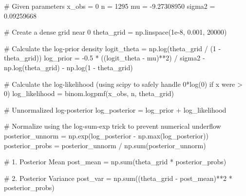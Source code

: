 \documentclass[
  letterpaper,
  DIV=11,
  numbers=noendperiod]{scrartcl}
\newenvironment{Shaded}{\begin{snugshade}}{\end{snugshade}}
\newcommand{\BuiltInTok}[1]{\textcolor[rgb]{0.00,0.23,0.31}{#1}}
\newcommand{\CommentTok}[1]{\textcolor[rgb]{0.37,0.37,0.37}{#1}}
\newcommand{\DecValTok}[1]{\textcolor[rgb]{0.68,0.00,0.00}{#1}}
\newcommand{\FloatTok}[1]{\textcolor[rgb]{0.68,0.00,0.00}{#1}}
\newcommand{\NormalTok}[1]{\textcolor[rgb]{0.00,0.23,0.31}{#1}}
\newcommand{\OperatorTok}[1]{\textcolor[rgb]{0.37,0.37,0.37}{#1}}
\begin{document}
\begin{Shaded}
\begin{Highlighting}[]
\CommentTok{\# Given parameters}
\NormalTok{x\_obs }\OperatorTok{=} \DecValTok{0}
\NormalTok{n }\OperatorTok{=} \DecValTok{1295}
\NormalTok{mu }\OperatorTok{=} \OperatorTok{{-}}\FloatTok{9.27308950}
\NormalTok{sigma2 }\OperatorTok{=} \FloatTok{0.09259668}

\CommentTok{\# Create a dense grid near 0}
\NormalTok{theta\_grid }\OperatorTok{=}\NormalTok{ np.linspace(}\FloatTok{1e{-}8}\NormalTok{, }\FloatTok{0.001}\NormalTok{, }\DecValTok{20000}\NormalTok{)}

\CommentTok{\# Calculate the log{-}prior density}
\NormalTok{logit\_theta }\OperatorTok{=}\NormalTok{ np.log(theta\_grid }\OperatorTok{/}\NormalTok{ (}\DecValTok{1} \OperatorTok{{-}}\NormalTok{ theta\_grid))}
\NormalTok{log\_prior }\OperatorTok{=} \OperatorTok{{-}}\FloatTok{0.5} \OperatorTok{*}\NormalTok{ ((logit\_theta }\OperatorTok{{-}}\NormalTok{ mu)}\OperatorTok{**}\DecValTok{2}\NormalTok{) }\OperatorTok{/}\NormalTok{ sigma2 }\OperatorTok{{-}}\NormalTok{ np.log(theta\_grid) }\OperatorTok{{-}}\NormalTok{ np.log(}\DecValTok{1} \OperatorTok{{-}}\NormalTok{ theta\_grid)}

\CommentTok{\# Calculate the log{-}likelihood (using scipy to safely handle 0*log(0) if x were \textgreater{} 0)}
\NormalTok{log\_likelihood }\OperatorTok{=}\NormalTok{ binom.logpmf(x\_obs, n, theta\_grid)}

\CommentTok{\# Unnormalized log{-}posterior}
\NormalTok{log\_posterior }\OperatorTok{=}\NormalTok{ log\_prior }\OperatorTok{+}\NormalTok{ log\_likelihood}

\CommentTok{\# Normalize using the log{-}sum{-}exp trick to prevent numerical underflow}
\NormalTok{posterior\_unnorm }\OperatorTok{=}\NormalTok{ np.exp(log\_posterior }\OperatorTok{{-}}\NormalTok{ np.}\BuiltInTok{max}\NormalTok{(log\_posterior))}
\NormalTok{posterior\_probs }\OperatorTok{=}\NormalTok{ posterior\_unnorm }\OperatorTok{/}\NormalTok{ np.}\BuiltInTok{sum}\NormalTok{(posterior\_unnorm)}

\CommentTok{\# 1. Posterior Mean}
\NormalTok{post\_mean }\OperatorTok{=}\NormalTok{ np.}\BuiltInTok{sum}\NormalTok{(theta\_grid }\OperatorTok{*}\NormalTok{ posterior\_probs)}

\CommentTok{\# 2. Posterior Variance}
\NormalTok{post\_var }\OperatorTok{=}\NormalTok{ np.}\BuiltInTok{sum}\NormalTok{((theta\_grid }\OperatorTok{{-}}\NormalTok{ post\_mean)}\OperatorTok{**}\DecValTok{2} \OperatorTok{*}\NormalTok{ posterior\_probs)}


\end{Highlighting}
\end{Shaded}
\end{document}

